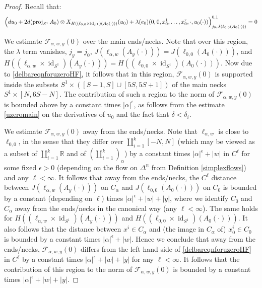 \documentclass[12pt]{article}
\theoremstyle{definition}
\theoremstyle{remark}
\numberwithin{equation}{subsection}
\newcommand{\F}{\mathcal F}
\newcommand{\RR}{\mathbb R}
\newcommand{\proj}{\operatorname{proj}}
\newcommand{\id}{\operatorname{id}}
\begin{document}
\begin{proof}
Recall that:
\begin{equation}\label{delbareqnforuzeroHF}
\Bigl(du_0+2d(\proj_{S^1}A_0)\otimes X_{H((\ell_{0,0}\times\id_{S^1})(A_0(\cdot)))}(u_0)
+\lambda(e_0)(0,0,x_0^1,\ldots,x_0^r,\cdot,u_0(\cdot))\Bigr)^{0,1}_{j_0,J(\ell_{0,0}(A_0(\cdot)))}=0
\end{equation}

We estimate $\F_{\alpha,w,y}(0)$ over the main ends/necks.  Note that over this region, the $\lambda$ term vanishes, $j_y=j_0$, $J(\ell_{\alpha,w}(A_y(\cdot)))=J(\ell_{0,0}(A_0(\cdot)))$, and $H((\ell_{\alpha,w}\times\id_{S^1})(A_y(\cdot)))=H((\ell_{0,0}\times\id_{S^1})(A_0(\cdot)))$.  Now due to \eqref{delbareqnforuzeroHF}, it follows that in this region, $\F_{\alpha,w,y}(0)$ is supported inside the subsets $S^1\times([S-1,S]\cup[5S,5S+1])$ of the main necks $S^1\times[N,6S-N]$.  The contribution of such a region to the norm of $\F_{\alpha,w,y}(0)$ is bounded above by a constant times $\left|\alpha\right|^\epsilon$, as follows from the estimate \eqref{uzeromain} on the derivatives of $u_0$ and the fact that $\delta<\delta_i$.

We estimate $\F_{\alpha,w,y}(0)$ away from the ends/necks.  Note that $\ell_{\alpha,w}$ is close to $\ell_{0,0}$, in the sense that they differ over $\coprod_{i=1}^k[-N,N]$ (which may be viewed as a subset of $\coprod_{i=1}^k\RR$ and of $(\coprod_{i=1}^k)_\alpha$) by a constant times $\left|\alpha\right|^\epsilon+\left|w\right|$ in $C^\ell$ for some fixed $\epsilon>0$ (depending on the flow on $\Delta^n$ from Definition \ref{simplexflows}) and any $\ell<\infty$.  It follows that away from the ends/necks, the $C^\ell$ distance between $J(\ell_{\alpha,w}(A_y(\cdot)))$ on $C_\alpha$ and $J(\ell_{0,0}(A_0(\cdot)))$ on $C_0$ is bounded by a constant (depending on $\ell$) times $\left|\alpha\right|^\epsilon+\left|w\right|+\left|y\right|$, where we identify $C_0$ and $C_\alpha$ away from the ends/necks in the canonical way (any $\ell<\infty$).  The same holds for $H((\ell_{\alpha,w}\times\id_{S^1})(A_y(\cdot)))$ and $H((\ell_{0,0}\times\id_{S^1})(A_0(\cdot)))$.  It also follows that the distance between $x^i\in C_\alpha$ and (the image in $C_\alpha$ of) $x^i_0\in C_0$ is bounded by a constant times $|\alpha|^\epsilon+\left|w\right|$.  Hence we conclude that away from the ends/necks, $\F_{\alpha,w,y}(0)$ differs from the left hand side of \eqref{delbareqnforuzeroHF} in $C^\ell$ by a constant times $\left|\alpha\right|^\epsilon+\left|w\right|+\left|y\right|$ for any $\ell<\infty$.  It follows that the contribution of this region to the norm of $\F_{\alpha,w,y}(0)$ is bounded by a constant times $\left|\alpha\right|^\epsilon+\left|w\right|+\left|y\right|$.


\end{proof}
\end{document}
